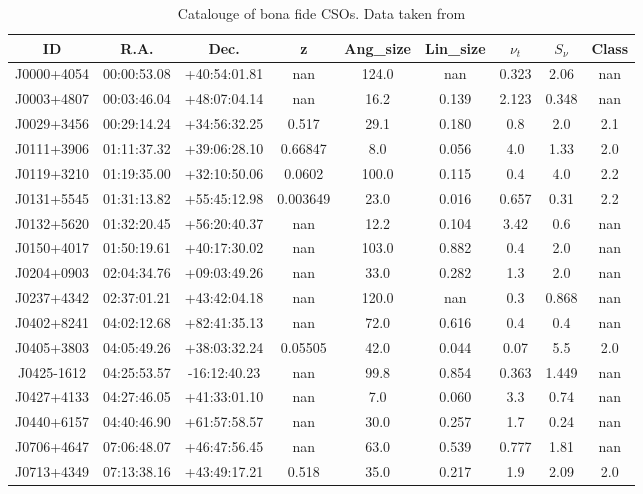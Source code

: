 \begin{table}[H]
    \centering
    \caption{Catalouge of bona fide CSOs. Data taken from \cite{kiehlmann2023compact}}
    \label{tab:CSO_sources}
    \begin{tabular}{@{}ccccccccc@{}}
        \toprule
        ID & R.A. & Dec. & z & Ang\_size & Lin\_size & $\nu_t$ & $S_\nu$ & Class \\ \midrule
        J0000+4054 & 00:00:53.08 & +40:54:01.81 & nan & 124.0 & nan & 0.323 & 2.06 & nan \\
        J0003+4807 & 00:03:46.04 & +48:07:04.14 & nan & 16.2 & 0.139 & 2.123 & 0.348 & nan \\
        J0029+3456 & 00:29:14.24 & +34:56:32.25 & 0.517 & 29.1 & 0.180 & 0.8 & 2.0 & 2.1 \\
        J0111+3906 & 01:11:37.32 & +39:06:28.10 & 0.66847 & 8.0 & 0.056 & 4.0 & 1.33 & 2.0 \\
        J0119+3210 & 01:19:35.00 & +32:10:50.06 & 0.0602 & 100.0 & 0.115 & 0.4 & 4.0 & 2.2 \\
        J0131+5545 & 01:31:13.82 & +55:45:12.98 & 0.003649 & 23.0 & 0.016 & 0.657 & 0.31 & 2.2 \\
        J0132+5620 & 01:32:20.45 & +56:20:40.37 & nan & 12.2 & 0.104 & 3.42 & 0.6 & nan \\
        J0150+4017 & 01:50:19.61 & +40:17:30.02 & nan & 103.0 & 0.882 & 0.4 & 2.0 & nan \\
        J0204+0903 & 02:04:34.76 & +09:03:49.26 & nan & 33.0 & 0.282 & 1.3 & 2.0 & nan \\
        J0237+4342 & 02:37:01.21 & +43:42:04.18 & nan & 120.0 & nan & 0.3 & 0.868 & nan \\
        J0402+8241 & 04:02:12.68 & +82:41:35.13 & nan & 72.0 & 0.616 & 0.4 & 0.4 & nan \\
        J0405+3803 & 04:05:49.26 & +38:03:32.24 & 0.05505 & 42.0 & 0.044 & 0.07 & 5.5 & 2.0 \\
        J0425-1612 & 04:25:53.57 & -16:12:40.23 & nan & 99.8 & 0.854 & 0.363 & 1.449 & nan \\
        J0427+4133 & 04:27:46.05 & +41:33:01.10 & nan & 7.0 & 0.060 & 3.3 & 0.74 & nan \\
        J0440+6157 & 04:40:46.90 & +61:57:58.57 & nan & 30.0 & 0.257 & 1.7 & 0.24 & nan \\
        J0706+4647 & 07:06:48.07 & +46:47:56.45 & nan & 63.0 & 0.539 & 0.777 & 1.81 & nan \\
        J0713+4349 & 07:13:38.16 & +43:49:17.21 & 0.518 & 35.0 & 0.217 & 1.9 & 2.09 & 2.0 \\

\end{tabular}
\end{table}
